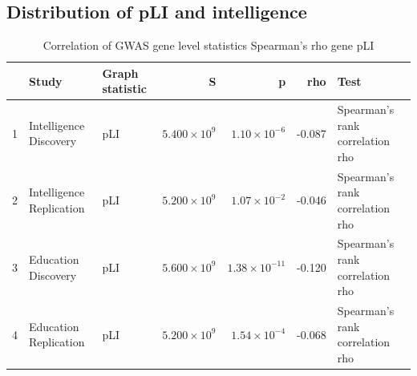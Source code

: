 \subsection{Distribution of pLI and intelligence}


\begin{table}[ht]
\centering
\begin{adjustbox}{max width=\textwidth}
\begin{tabular}{rllrrrl}
  \hline
 & Study & Graph statistic & S & p & rho & Test \\ 
  \hline
1 & Intelligence Discovery & pLI & $5.400 \times 10^{9}$ & $1.10 \times 10^{-6}$ & -0.087 & Spearman's rank correlation rho \\ 
  2 & Intelligence Replication & pLI & $5.200 \times 10^{9}$ & $1.07 \times 10^{-2}$ & -0.046 & Spearman's rank correlation rho \\ 
  3 & Education Discovery & pLI & $5.600 \times 10^{9}$ & $1.38 \times 10^{-11}$ & -0.120 & Spearman's rank correlation rho \\ 
  4 & Education Replication & pLI & $5.200 \times 10^{9}$ & $1.54 \times 10^{-4}$ & -0.068 & Spearman's rank correlation rho \\ 
   \hline
\end{tabular}
\end{adjustbox}
\caption{Correlation of GWAS gene level statistics Spearman's rho gene pLI} 
\label{Table:Correlation of GWAS gene level statistics Spearmans rho gene pLI}
\end{table}

